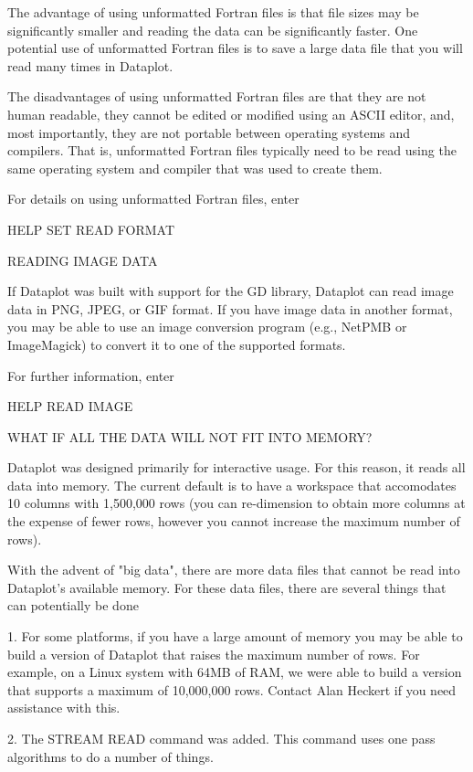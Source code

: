 The advantage of using unformatted Fortran files is that file sizes
may be significantly smaller and reading the data can be significantly
faster.  One potential use of unformatted Fortran files is to save
a large data file that you will read many times in Dataplot.

The disadvantages of using unformatted Fortran files are that they
are not human readable, they cannot be edited or modified using an
ASCII editor, and, most importantly, they are not portable between
operating systems and compilers.  That is, unformatted Fortran files
typically need to be read using the same operating system and compiler
that was used to create them.

For details on using unformatted Fortran files, enter

     HELP SET READ FORMAT


READING IMAGE DATA

If Dataplot was built with support for the GD library, Dataplot
can read image data in PNG, JPEG, or GIF format.  If you have
image data in another format, you may be able to use an image
conversion program (e.g., NetPMB or ImageMagick) to convert it
to one of the supported formats.

For further information, enter

    HELP READ IMAGE


WHAT IF ALL THE DATA WILL NOT FIT INTO MEMORY?

Dataplot was designed primarily for interactive usage.  For this reason,
it reads all data into memory.  The current default is to have a
workspace that accomodates 10 columns with 1,500,000 rows (you can
re-dimension to obtain more columns at the expense of fewer rows, however
you cannot increase the maximum number of rows).

With the advent of "big data", there are more data files that cannot be
read into Dataplot's available memory.  For these data files, there are
several things that can potentially be done

   1. For some platforms, if you have a large amount of memory you may
      be able to build a version of Dataplot that raises the maximum
      number of rows.  For example, on a Linux system with 64MB of RAM,
      we were able to build a version that supports a maximum of
      10,000,000 rows.  Contact Alan Heckert if you need assistance
      with this.

   2. The STREAM READ command was added.  This command uses one pass
      algorithms to do a number of things.

